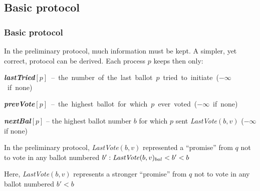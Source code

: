 \documentclass[10 pt]{beamer}
\begin{document}
\subsection{Basic protocol}


\begin{frame}
\frametitle{Basic protocol}

In the preliminary protocol, much information must be kept. A simpler, yet correct, protocol can be derived. Each process $p$ keeps then only:

\vspace{2 mm}
\mbox{\textit{\textbf{lastTried}}$[p]$ -- the number of the last ballot $p$ tried to initiate ($-\infty$ if none)}

\vspace{2mm}
\mbox{\textit{\textbf{prevVote}}$[p]$ -- the highest ballot for which $p$ ever voted ($-\infty$ if none)}

\vspace{2mm}
\textit{\textbf{nextBal}}$[p]$ -- the highest ballot number $b$ for which $p$ sent \textit{LastVote}$(b, v)$ ($-\infty$ if none)

\vspace{4mm}
In the preliminary protocol, \textit{LastVote}$(b, v)$ represented a ``promise'' from $q$ not to vote in any ballot numbered $b' : \text{\textit{LastVote}}(b, v)_{bal} < b' < b$ 

\vspace{2mm}
Here, \textit{LastVote}$(b, v)$ represents a stronger ``promise'' from $q$ not to vote in any ballot numbered $b' < b$

\end{frame}
\end{document}
